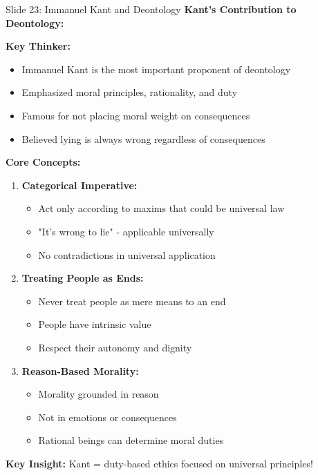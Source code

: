 \documentclass[8pt]{beamer}
\begin{document}
	\begin{frame}{Slide 23: Immanuel Kant and Deontology}
		\fontsize{6.5}{7.5}\selectfont
		\textbf{Kant's Contribution to Deontology:}
		
		\vspace{0.1cm}
		\textbf{Key Thinker:}
		\begin{itemize}
			\item Immanuel Kant is the most important proponent of deontology
			\item Emphasized moral principles, rationality, and duty
			\item Famous for not placing moral weight on consequences
			\item Believed lying is always wrong regardless of consequences
		\end{itemize}
		
		\vspace{0.1cm}
		\textbf{Core Concepts:}
		\begin{enumerate}
			\item \textbf{Categorical Imperative:}
			\begin{itemize}
				\item Act only according to maxims that could be universal law
				\item "It's wrong to lie" - applicable universally
				\item No contradictions in universal application
			\end{itemize}
			\item \textbf{Treating People as Ends:}
			\begin{itemize}
				\item Never treat people as mere means to an end
				\item People have intrinsic value
				\item Respect their autonomy and dignity
			\end{itemize}
			\item \textbf{Reason-Based Morality:}
			\begin{itemize}
				\item Morality grounded in reason
				\item Not in emotions or consequences
				\item Rational beings can determine moral duties
			\end{itemize}
		\end{enumerate}
		
		\textcolor{myblue}{\textbf{Key Insight:}} Kant = \textcolor{myblue}{duty-based ethics focused on universal principles}!
	\end{frame}
	
\end{document}

